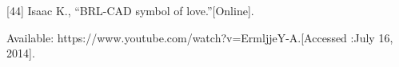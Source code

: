 \documentclass[11pt, oneside]{Thesis} %
\begin{document}
[44] Isaac K., “BRL-CAD symbol of love.”[Online].

Available: https://www.youtube.com/watch?v=ErmljjeY-A.[Accessed :July 16, 2014].


\backmatter

\appendix %



\end{document}
